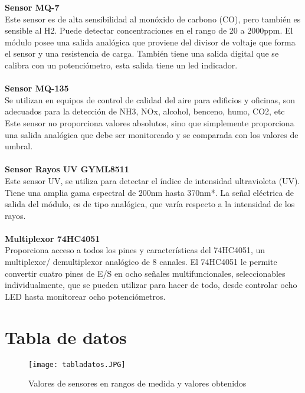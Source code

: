 \documentclass[10pt,a4paper]{article}
\begin{document}
\textbf{Sensor MQ-7}\\

Este sensor es de alta sensibilidad al monóxido de carbono (CO), pero también es sensible al H2.  Puede detectar concentraciones en el rango de 20 a 2000ppm.
El módulo posee una salida analógica que proviene del divisor de voltaje que forma el sensor y una resistencia de carga. También tiene una salida digital que se calibra con un potenciómetro, esta salida tiene un led indicador.\\\\

\textbf{Sensor MQ-135}\\

Se utilizan en equipos de control de calidad del aire para edificios y oficinas, son adecuados para la detección de NH3, NOx, alcohol, benceno, humo, CO2, etc
Este sensor no proporciona valores absolutos, sino que simplemente proporciona una salida analógica que debe ser monitoreado y se comparada con los valores de umbral.\\\\

\textbf{Sensor Rayos UV GYML8511}\\

Este sensor UV, se utiliza para detectar el índice de intensidad ultravioleta (UV). Tiene una amplia gama espectral de 200nm hasta 370nm*. La señal eléctrica de salida del módulo, es de tipo analógica, que varía respecto a la intensidad de los rayos.\\\\

\textbf{Multiplexor 74HC4051}\\

Proporciona acceso a todos los pines y características del 74HC4051, un multiplexor/ demultiplexor analógico de 8 canales. El 74HC4051 le permite convertir cuatro pines de E/S en ocho señales multifuncionales, seleccionables individualmente, que se pueden utilizar para hacer de todo, desde controlar ocho LED hasta monitorear ocho potenciómetros.


\section{Tabla de datos}

\begin{figure}[H]
\centering
 \texttt{[image: tabladatos.JPG]} 
\caption{Valores de sensores en rangos de medida y valores obtenidos} 
\end{figure}
\end{document}

